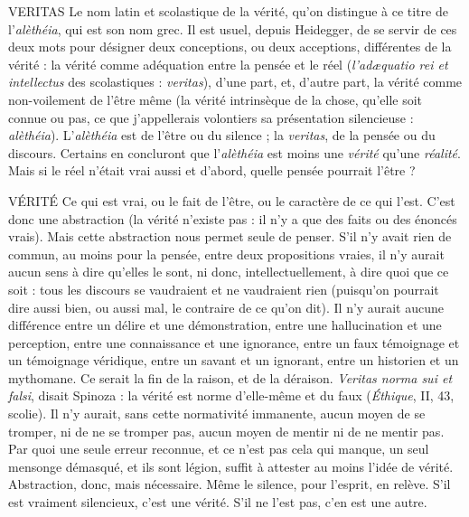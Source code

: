 VERITAS Le nom latin et scolastique de la vérité, qu’on distingue à ce titre
de l’{\it alèthéia}, qui est son nom grec. Il est usuel, depuis Heidegger,
de se servir de ces deux mots pour désigner deux conceptions, ou deux acceptions,
différentes de la vérité : la vérité comme adéquation entre la pensée et le
réel ({\it l'ad{\ae}quatio rei et intellectus} des scolastiques : {\it veritas}), d’une part, et, d’autre
part, la vérité comme non-voilement de l'être même (la vérité intrinsèque de la
chose, qu’elle soit connue ou pas, ce que j’appellerais volontiers sa présentation
silencieuse : {\it alèthéia}). L'{\it alèthéia} est de l'être ou du silence ; la {\it veritas}, de la
pensée ou du discours. Certains en concluront que l’{\it alèthéia} est moins une
{\it vérité} qu’une {\it réalité}. Mais si le réel n’était vrai aussi et d’abord, quelle pensée
pourrait l’être ?

VÉRITÉ Ce qui est vrai, ou le fait de l’être, ou le caractère de ce qui l’est.
C’est donc une abstraction (la vérité n’existe pas : il n’y a que des
faits ou des énoncés vrais). Mais cette abstraction nous permet seule de penser.
S’il n’y avait rien de commun, au moins pour la pensée, entre deux propositions
vraies, il n’y aurait aucun sens à dire qu’elles le sont, ni donc, intellectuellement,
à dire quoi que ce soit : tous les discours se vaudraient et ne vaudraient
rien (puisqu'on pourrait dire aussi bien, ou aussi mal, le contraire de ce qu’on
dit). Il n’y aurait aucune différence entre un délire et une démonstration, entre
une hallucination et une perception, entre une connaissance et une ignorance,
entre un faux témoignage et un témoignage véridique, entre un savant et un
ignorant, entre un historien et un mythomane. Ce serait la fin de la raison, et
de la déraison. {\it Veritas norma sui et falsi}, disait Spinoza : la vérité est norme
d’elle-même et du faux ({\it Éthique}, II, 43, scolie). Il n’y aurait, sans cette normativité
immanente, aucun moyen de se tromper, ni de ne se tromper pas, aucun
moyen de mentir ni de ne mentir pas. Par quoi une seule erreur reconnue, et
ce n'est pas cela qui manque, un seul mensonge démasqué, et ils sont légion,
suffit à attester au moins l’idée de vérité. Abstraction, donc, mais nécessaire.
Même le silence, pour l'esprit, en relève. S’il est vraiment silencieux, c’est une
vérité. S’il ne l’est pas, c’en est une autre.

